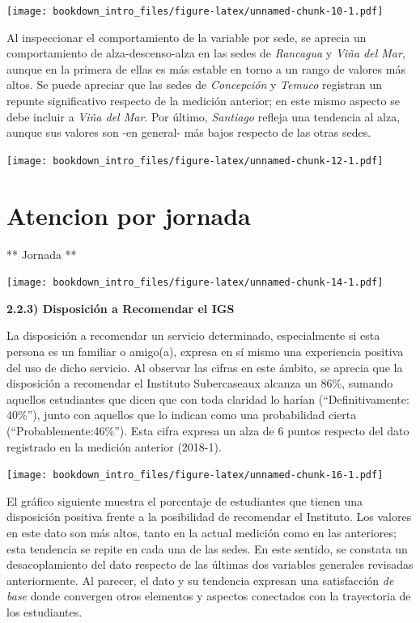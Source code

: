 \documentclass[]{book}
\begin{document}
\texttt{[image: bookdown\_intro\_files/figure-latex/unnamed-chunk-10-1.pdf]}

Al inspeccionar el comportamiento de la variable por sede, se aprecia un
comportamiento de alza-descenso-alza en las sedes de \emph{Rancagua} y
\emph{Viña del Mar}, aunque en la primera de ellas es más estable en
torno a un rango de valores más altos. Se puede apreciar que las sedes
de \emph{Concepción} y \emph{Temuco} registran un repunte significativo
respecto de la medición anterior; en este mismo aspecto se debe incluir
a \emph{Viña del Mar}. Por último, \emph{Santiago} refleja una tendencia
al alza, aunque sus valores son -en general- más bajos respecto de las
otras sedes.

\texttt{[image: bookdown\_intro\_files/figure-latex/unnamed-chunk-12-1.pdf]}

\section{Atencion por jornada}\label{atencion-por-jornada}

** Jornada **

\texttt{[image: bookdown\_intro\_files/figure-latex/unnamed-chunk-14-1.pdf]}

\textbf{2.2.3) Disposición a Recomendar el IGS}

La disposición a recomendar un servicio determinado, especialmente si
esta persona es un familiar o amigo(a), expresa en sí mismo una
experiencia positiva del uso de dicho servicio. Al observar las cifras
en este ámbito, se aprecia que la disposición a recomendar el Instituto
Subercaseaux alcanza un 86\%, sumando aquellos estudiantes que dicen que
con toda claridad lo harían (``Definitivamente: 40\%''), junto con
aquellos que lo indican como una probabilidad cierta
(``Probablemente:46\%''). Esta cifra expresa un alza de 6 puntos
respecto del dato registrado en la medición anterior (2018-1).

\texttt{[image: bookdown\_intro\_files/figure-latex/unnamed-chunk-16-1.pdf]}

El gráfico siguiente muestra el porcentaje de estudiantes que tienen una
disposición positiva frente a la posibilidad de recomendar el Instituto.
Los valores en este dato son más altos, tanto en la actual medición como
en las anteriores; esta tendencia se repite en cada una de las sedes. En
este sentido, se constata un desacoplamiento del dato respecto de las
últimas dos variables generales revisadas anteriormente. Al parecer, el
dato y su tendencia expresan una satisfacción \emph{de base} donde
convergen otros elementos y aspectos conectados con la trayectoria de
los estudiantes.
\end{document}
